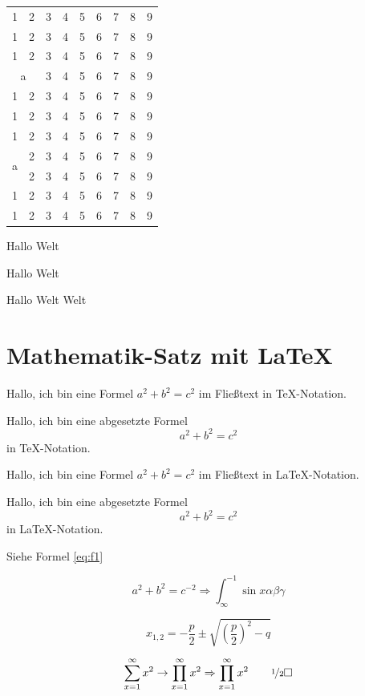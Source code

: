 \documentclass[12pt,parskip=half]{scrartcl}
\begin{document}
\begin{tabular}{ccccccccc}
1 & 2 & 3 & 4 & 5 & 6 & 7 & 8 & 9 \\
1 & 2 & 3 & 4 & 5 & 6 & 7 & 8 & 9 \\
1 & 2 & 3 & 4 & 5 & 6 & 7 & 8 & 9 \\
\multicolumn{2}{c}{a} & 3 & 4 & 5 & 6 & 7 & 8 & 9 \\
1 & 2 & 3 & 4 & 5 & 6 & 7 & 8 & 9 \\
1 & 2 & 3 & 4 & 5 & 6 & 7 & 8 & 9 \\
1 & 2 & 3 & 4 & 5 & 6 & 7 & 8 & 9 \\
\multirow[c]{2}{*}{a} & 2 & 3 & 4 & 5 & 6 & 7 & 8 & 9 \\
  & 2 & 3 & 4 & 5 & 6 & 7 & 8 & 9 \\
1 & 2 & 3 & 4 & 5 & 6 & 7 & 8 & 9 \\
1 & 2 & 3 & 4 & 5 & 6 & 7 & 8 & 9 \\
\end{tabular}

Hallo Welt

Hallo \hspace*{1cm}       Welt

Hallo \hfill Welt \vfill Welt

\section{Mathematik-Satz mit \LaTeX}

Hallo, ich bin eine Formel $a^2+b^2=c^2$ im Fließtext in \TeX-Notation.

Hallo, ich bin eine abgesetzte Formel $$a^2+b^2=c^2$$ in \TeX-Notation.

Hallo, ich bin eine Formel \(a^2+b^2=c^2\) im Fließtext in \LaTeX-Notation.

Hallo, ich bin eine abgesetzte Formel \[a^2+b^2=c^2\] in \LaTeX-Notation.

Siehe Formel \ref{eq:f1}

\begin{equation}
a^2+b^2=c^{-2} \Rightarrow \int_{\infty}^{-1}  \sin x  \alpha \beta \gamma \label{eq:f1}
\end{equation}

\begin{equation}
x_{1, 2} = -\frac{p}{2} \pm \sqrt{ \left(\frac{p}{2}\right)^2 - q }
\end{equation}

\begin{equation}
\sum_{x=1}^{\infty} x^2  \rightarrow \prod_{x=1}^{\infty} x^2  \Rightarrow \prod_{x=1}^{\infty} x^2 \qquad \nicefrac{1}{2}\Box
\end{equation}
\end{document}
